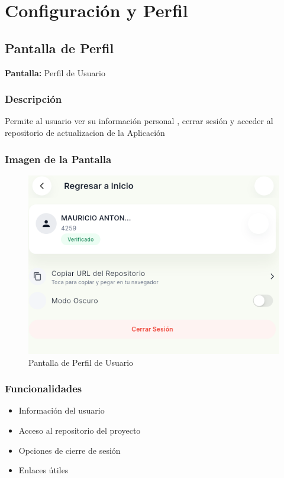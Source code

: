\documentclass[12pt,a4paper]{report}
\begin{document}
\chapter{Configuración y Perfil}

\section{Pantalla de Perfil}

\begin{pantallabox}
\textbf{Pantalla:} Perfil de Usuario \\
\end{pantallabox}

\subsection{Descripción}
Permite al usuario ver su información personal , cerrar sesión  y acceder al repositorio de actualizacion de la Aplicación

\subsection{Imagen de la Pantalla}
\begin{figure}[H]
    \centering
     \includegraphics[width=\textwidth]{pantallas/configuracion.png}
    \caption{Pantalla de Perfil de Usuario}
    \label{fig:profile}
\end{figure}

\subsection{Funcionalidades}
\begin{caracteristicabox}
\begin{itemize}[leftmargin=*]
    \item Información del usuario
    \item Acceso al repositorio del proyecto
    \item Opciones de cierre de sesión
    \item Enlaces útiles
\end{itemize}
\end{caracteristicabox}
\end{document}
